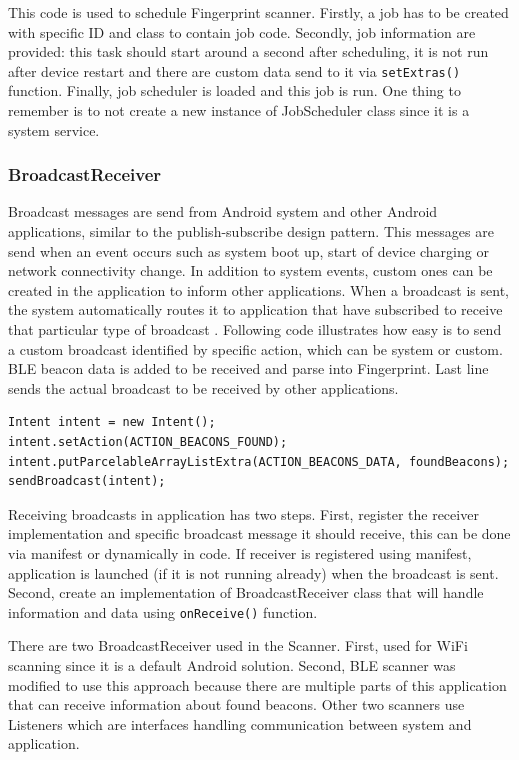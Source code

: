 This code is used to schedule Fingerprint scanner. Firstly, a job has to be created with specific ID and class to contain job code. Secondly, job information are provided: this task should start around a second after scheduling, it is not run after device restart and there are custom data send to it via \verb|setExtras()| function. Finally, job scheduler is loaded and this job is run. One thing to remember is to not create a new instance of JobScheduler class since it is a system service.

\subsubsection{BroadcastReceiver}\label{subsubsec:BroadcastReceiver}
Broadcast messages are send from Android system and other Android applications, similar to the publish-subscribe design pattern. This messages are send when an event occurs such as system boot up, start of device charging or network connectivity change. In addition to system events, custom ones can be created in the application to inform other applications. When a broadcast is sent, the system automatically routes it to application that have subscribed to receive that particular type of broadcast \cite{AD}. Following code illustrates how easy is to send a custom broadcast identified by specific action, which can be system or custom. BLE beacon data is added to be received and parse into Fingerprint. Last line sends the actual broadcast to be received by other applications.

\begin{lstlisting}[caption=Send broadcast with BLE beacons found.]
Intent intent = new Intent();
intent.setAction(ACTION_BEACONS_FOUND);
intent.putParcelableArrayListExtra(ACTION_BEACONS_DATA, foundBeacons);
sendBroadcast(intent);
\end{lstlisting}

Receiving broadcasts in application has two steps. First, register the receiver implementation and specific broadcast message it should receive, this can be done via manifest or dynamically in code. If receiver is registered using manifest, application is launched (if it is not running already) when the broadcast is sent. Second, create an implementation of BroadcastReceiver class that will handle information and data using \verb|onReceive()| function.

There are two BroadcastReceiver used in the Scanner. First, used for WiFi scanning since it is a default Android solution. Second, BLE scanner was modified to use this approach because there are multiple parts of this application that can receive information about found beacons. Other two scanners use Listeners which are interfaces handling communication between system and application.

